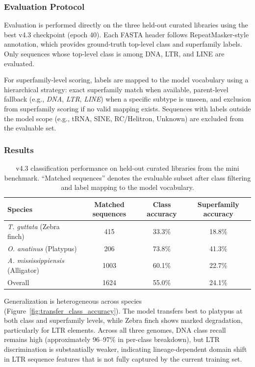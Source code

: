 \documentclass[12pt]{article}
\begin{document}
\subsubsection{Evaluation Protocol}

Evaluation is performed directly on the three held-out curated libraries using the best v4.3 checkpoint (epoch 40). Each FASTA header follows RepeatMasker-style annotation, which provides ground-truth top-level class and superfamily labels. Only sequences whose top-level class is among DNA, LTR, and LINE are evaluated. 

For superfamily-level scoring, labels are mapped to the model vocabulary using a hierarchical strategy: exact superfamily match when available, parent-level fallback (e.g., \textit{DNA}, \textit{LTR}, \textit{LINE}) when a specific subtype is unseen, and exclusion from superfamily scoring if no valid mapping exists. Sequences with labels outside the model scope (e.g., tRNA, SINE, RC/Helitron, Unknown) are excluded from the evaluable set. 

\subsubsection{Results}

\begin{table}[h]
\centering
\begin{tabular}{lccc}
\hline
Species & Matched sequences & Class accuracy & Superfamily accuracy \\
\hline
\textit{T. guttata} (Zebra finch) & 415 & 33.3\% & 18.8\% \\
\textit{O. anatinus} (Platypus) & 206 & 73.8\% & 41.3\% \\
\textit{A. mississippiensis} (Alligator) & 1003 & 60.1\% & 22.7\% \\
\hline
Overall & 1624 & 55.0\% & 24.1\% \\
\hline
\end{tabular}
\caption{v4.3 classification performance on held-out curated libraries from the mini benchmark. ``Matched sequences'' denotes the evaluable subset after class filtering and label mapping to the model vocabulary.}
\label{tab:mini_benchmark}
\end{table}

Generalization is heterogeneous across species (Figure~\ref{fig:transfer_class_accuracy}). The model transfers best to platypus at both class and superfamily levels, while Zebra finch shows marked degradation, particularly for LTR elements. Across all three genomes, DNA class recall remains high (approximately 96--97\% in per-class breakdown), but LTR discrimination is substantially weaker, indicating lineage-dependent domain shift in LTR sequence features that is not fully captured by the current training set.
\end{document}
